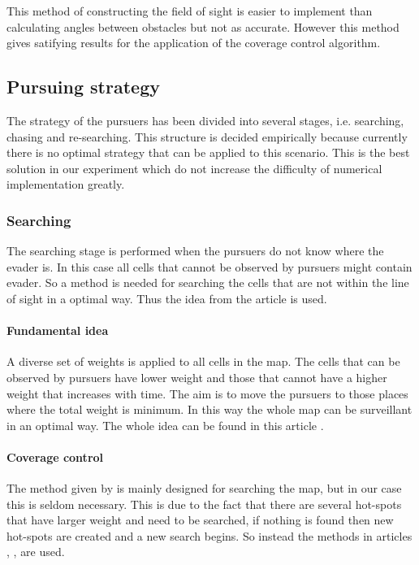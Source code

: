 \documentclass[ebook,11pt] {kth-mag}
\begin{document}
This method of constructing the field of sight is easier to implement than calculating angles between obstacles but not as accurate. However this method gives satifying results for the application of the coverage control algorithm. 

\subsection{Pursuing strategy}
The strategy of the pursuers has been divided into several stages, i.e. searching, chasing and re-searching. This structure is decided empirically because currently there is no optimal strategy that can be applied to this scenario. This is the best solution in our experiment which do not increase the difficulty of numerical implementation greatly.

\subsubsection{Searching}
The searching stage is performed when the pursuers do not know where the evader is. In this case all cells that cannot be observed by pursuers might contain evader. So a method is needed for searching the cells that are not within the line of sight in a optimal way. Thus the idea from the article \cite{sui} is used. 

\paragraph{Fundamental idea}
A diverse set of weights is applied to all cells in the map. The cells that can be observed by pursuers have lower weight and those that cannot have a higher weight that increases with time. The aim is to move the pursuers to those places where the total weight is minimum. In this way the whole map can be surveillant in an optimal way. The whole idea can be found in this article \cite{sui}.  

\paragraph{Coverage control}
The method given by \cite{sui} is mainly designed for searching the map, but in our case this is seldom necessary. This is due to the fact that there are several hot-spots that have larger weight and need to be searched, if nothing is found then new hot-spots are created and a new search begins. So instead the methods in articles \cite{cov}, \cite{noncov}, \cite{perfcov} are used. 
\end{document}

